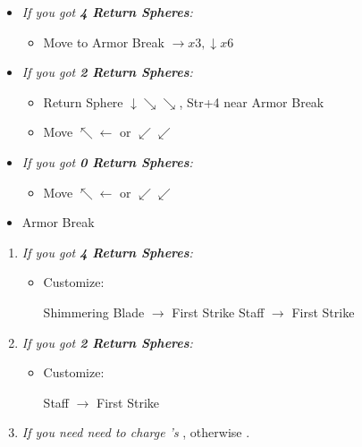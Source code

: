 \begin{spheregrid}
\begin{multicols}{2}
\begin{itemize}
                \begin{itemize}
                    \item \textit{If you got \textbf{4 Return Spheres}:}
                        \begin{itemize}
                            \item Move to Armor Break $\rightarrow x3, \downarrow x6$
                        \end{itemize}
                    \item \textit{If you got \textbf{2 Return Spheres}:}
                        \begin{itemize}
                            \item Return Sphere $\downarrow\searrow\searrow$, Str+4 near Armor Break
                            \item Move $\nwarrow\leftarrow$ or $\swarrow\swarrow$
                        \end{itemize}
                    \item \textit{If you got \textbf{0 Return Spheres}:}
                        \begin{itemize}
                            \item Move $\nwarrow\leftarrow$ or $\swarrow\swarrow$
                        \end{itemize}
                    \item Armor Break
                \end{itemize}
        \end{itemize}
    \end{multicols}
\end{spheregrid}
\colstart
\begin{enumerate}[resume]
    \item \textit{If you got \textbf{4 Return Spheres}:}
        \begin{itemize}
            \item Customize:
                \begin{itemize}
                    \auronf Shimmering Blade $\rightarrow$ First Strike
                    \yunaf Staff $\rightarrow$ First Strike
                \end{itemize}
        \end{itemize}
    \item \textit{If you got \textbf{2 Return Spheres}:}
        \begin{itemize}
            \item Customize:
            \begin{itemize}
                \yunaf Staff $\rightarrow$ First Strike
            \end{itemize}
        \end{itemize}
    \bothvfill
    \winvfill
    \lossvfill
    \item \textit{If you need need to charge \rikku's \od} \formation{\tidus}{\rikku}{\auron}, otherwise \formation{\tidus}{\kimahri}{\wakka}.
\end{enumerate}

